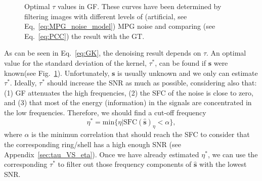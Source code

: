 \begin{figure}
  \centering
  \caption{Optimal $\tau$ values in GF. These curves have been
    determined by filtering images with different levels of
    (artificial, see Eq,~\ref{eq:MPG_noise_model}) MPG noise and
    comparing (see Eq.~\ref{eq:PCC}) the result with the
    \gls{GT}.\label{fig:optimal_GF_tau}}
\end{figure}

As can be seen in Eq.~\ref{eq:GK}, the denoising result depends on
$\tau$. An optimal value for the standard deviation of the kernel,
$\tau^*$, can be found if $\mathbf{s}$ were known(see
Fig.~\ref{fig:optimal_GF_tau}). Unfortunately, $\mathbf{s}$ is usually
unknown and we only can estimate $\tau^*$. Ideally, $\tau^*$ should
increase the \gls{SNR} as much as possible, considering also that: (1)
\gls{GF} attenuates the high frequencies, (2) the \gls{SFC} of the
noise is close to zero, and (3) that most of the energy (information)
in the signals are concentrated in the low frequencies. Therefore, we
should find a cut-off frequency
\begin{equation}
  \eta^* = \text{min}\{\eta|\text{SFC}(\hat{\mathbf{s}})_\eta < \alpha\},
  \label{eq:search_eta}
\end{equation}
where $\alpha$ is the minimun correlation that should reach the SFC to consider that the corresponding ring/shell has a high enough \gls{SNR} (see
Appendix~\ref{sec:tau_VS_eta}). Once we have already estimated
$\eta^*$, we can use the corresponding $\tau^*$ to filter out those
frequency components of $\hat{\mathbf{s}}$ with the lowest SNR.

